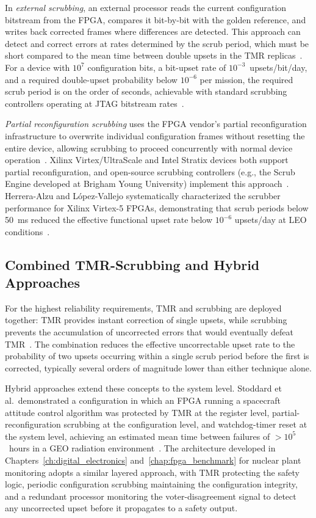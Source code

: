 In \emph{external scrubbing}, an external processor reads the
current configuration bitstream from the FPGA, compares it
bit-by-bit with the golden reference, and writes back corrected
frames where differences are detected.  This approach can detect
and correct errors at rates determined by the scrub period,
which must be short compared to the mean time between double
upsets in the TMR replicas~\cite{heiner2009scrubbing}.  For a
device with $10^7$ configuration bits, a bit-upset rate of
$10^{-3}$~upsets/bit/day, and a required double-upset probability
below $10^{-6}$ per mission, the required scrub period is
on the order of seconds, achievable with standard scrubbing
controllers operating at JTAG bitstream rates~\cite{wirthlin2016scrubbing}.

\emph{Partial reconfiguration scrubbing} uses the FPGA vendor's
partial reconfiguration infrastructure to overwrite individual
configuration frames without resetting the entire device,
allowing scrubbing to proceed concurrently with normal device
operation~\cite{pratt2008partial}.  Xilinx Virtex/UltraScale
and Intel Stratix devices both support partial reconfiguration,
and open-source scrubbing controllers (e.g., the Scrub Engine
developed at Brigham Young University) implement this
approach~\cite{wirthlin2016scrubbing}.  Herrera-Alzu and
L\'{o}pez-Vallejo systematically characterized the scrubber
performance for Xilinx Virtex-5 FPGAs, demonstrating that
scrub periods below 50~ms reduced the effective functional
upset rate below $10^{-6}$ upsets/day at LEO
conditions~\cite{herreraalzu2013scrubbers}.

\subsection{Combined TMR-Scrubbing and Hybrid Approaches}

For the highest reliability requirements, TMR and scrubbing are
deployed together: TMR provides instant correction of single
upsets, while scrubbing prevents the accumulation of uncorrected
errors that would eventually defeat TMR~\cite{kastensmidt2014survey}.
The combination reduces the effective uncorrectable upset rate to
the probability of two upsets occurring within a single scrub
period before the first is corrected, typically several orders
of magnitude lower than either technique alone.

Hybrid approaches extend these concepts to the system level.
Stoddard et al.\ demonstrated a configuration in which an FPGA
running a spacecraft attitude control algorithm was protected by
TMR at the register level, partial-reconfiguration scrubbing at
the configuration level, and watchdog-timer reset at the system
level, achieving an estimated mean time between failures of
$> 10^5$~hours in a GEO radiation environment~\cite{stoddard2017hybrid}.
The architecture developed in Chapters~\ref{ch:digital_electronics} and~\ref{chap:fpga_benchmark} for
nuclear plant monitoring adopts a similar layered approach, with
TMR protecting the safety logic, periodic configuration scrubbing
maintaining the configuration integrity, and a redundant
processor monitoring the voter-disagreement signal to detect any
uncorrected upset before it propagates to a safety output.

